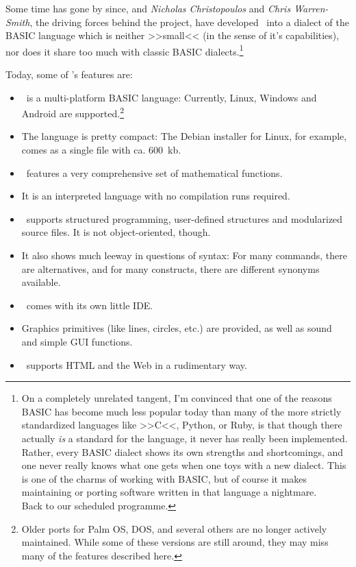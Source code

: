 Some time has gone by since, and \emph{Nicholas Christopoulos} and
\emph{Chris Warren-Smith}, the driving forces behind the project, have
developed \SB\ into a dialect of the BASIC language which is neither
>>small<< (in the sense of it's capabilities), nor does it share too
much with classic BASIC dialects.\footnote{On a completely unrelated
tangent, I'm convinced that one of the reasons BASIC has become much
less popular today than many of the more strictly standardized languages
like >>C<<, Python, or Ruby, is that though there
actually \emph{is} a standard for the language, it never has really been
implemented. Rather, every BASIC dialect shows its own strengths and
shortcomings, and one never really knows what one gets when one toys
with a new dialect. This is one of the charms of working with BASIC, but
of course it makes maintaining or porting software written in that
language a nightmare.\\Back to our scheduled programme.}  

Today, some of \SB's features are:

\begin{itemize}

\item \SB\ is a multi-platform BASIC language: Currently, Linux, 
Windows and Android are supported.\footnote{Older ports for Palm OS, DOS,
and several others are no longer actively maintained. While some of
these versions are still around, they may miss many of the features
described here.}

\item The language is pretty compact: The Debian installer for Linux,
for example, comes as a single file with ca. 600~kb.

\item \SB\ features a very comprehensive set of mathematical functions.

\item It is an interpreted language with no compilation runs required.

\item \SB\ supports structured programming, user-defined structures and
modularized source files.  It is not object-oriented, though.

\item It also shows much leeway in questions of syntax: For many
commands, there are alternatives, and for many constructs, there are
different synonyms available.

\item \SB\ comes with its own little IDE.

\item Graphics primitives (like lines, circles, etc.) are provided, as
well as sound and simple GUI functions.

\item \SB\ supports HTML and the Web in a rudimentary way.

\end{itemize}

